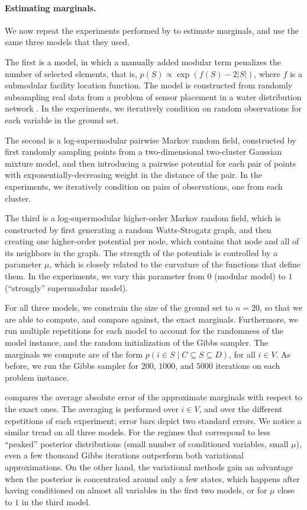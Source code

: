 \paragraph{Estimating marginals.}
We now repeat the experiments performed by \cite{djolonga14} to estimate marginals, and use the same three models that they used.

The first is a \flid{} model, in which a manually added modular term penalizes the number of selected elements, that is, $p(S) \propto \exp(f(S)-2|S|)$, where $f$ is a submodular facility location function.
The model is constructed from randomly subsampling real data from a problem of sensor placement in a water distribution network \citep{krause08}.
In the experiments, we iteratively condition on random observations for each variable in the ground set.

The second is a log-supermodular pairwise Markov random field, constructed by first randomly sampling points from a two-dimensional two-cluster Gaussian mixture model, and then introducing a pairwise potential for each pair of points with exponentially-decreasing weight in the distance of the pair.
In the experiments, we iteratively condition on pairs of observations, one from each cluster.

The third is a log-supermodular higher-order Markov random field, which is constructed by first generating a random Watts-Strogatz graph, and then creating one higher-order potential per node, which contains that node and all of its neighbors in the graph.
The strength of the potentials is controlled by a parameter $\mu$, which is closely related to the curvature of the functions that define them.
In the experiments, we vary this parameter from $0$ (modular model) to $1$ (``strongly'' supermodular model).

For all three models, we constrain the size of the ground set to $n = 20$, so that we are able to compute, and compare against, the exact marginals.
Furthermore, we run multiple repetitions for each model to account for the randomness of the model instance, and the random initialization of the Gibbs sampler.
The marginals we compute are of the form $p(i \in S \mid C \subseteq S \subseteq D)$, for all $i \in V$.
As before, we run the Gibbs sampler for $200$, $1000$, and $5000$ iterations on each problem instance.

 compares the average absolute error of the approximate marginals with respect to the exact ones.
The averaging is performed over $i \in V$, and over the different repetitions of each experiment; error bars depict two standard errors.
We notice a similar trend on all three models.
For the regimes that correspond to less ``peaked'' posterior distributions (small number of conditioned variables, small $\mu$), even a few thousand Gibbs iterations outperform both variational approximations.
On the other hand, the variational methods gain an advantage when the posterior is concentrated around only a few states, which happens after having conditioned on almost all variables in the first two models, or for $\mu$ close to $1$ in the third model.

